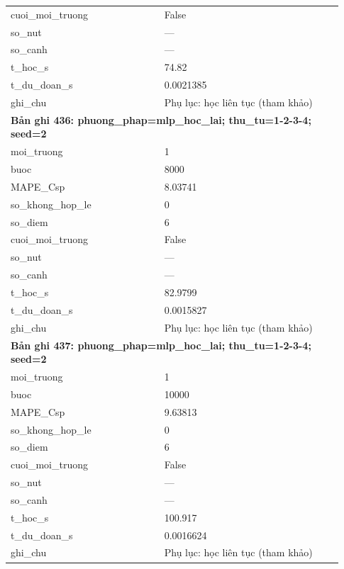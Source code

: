 \begin{longtable}{p{0.43\linewidth}p{0.50\linewidth}}
cuoi\_\allowbreak moi\_\allowbreak truong & False \\
so\_\allowbreak nut & — \\
so\_\allowbreak canh & — \\
t\_\allowbreak hoc\_\allowbreak s & 74.82 \\
t\_\allowbreak du\_\allowbreak doan\_\allowbreak s & 0.0021385 \\
ghi\_\allowbreak chu & Phụ lục: học liên tục (tham khảo) \\
\midrule
\multicolumn{2}{p{0.95\linewidth}}{\textbf{Bản ghi 436: phuong\_phap=mlp\_hoc\_lai; thu\_tu=1-2-3-4; seed=2}} \\
moi\_\allowbreak truong & 1 \\
buoc & 8000 \\
MAPE\_\allowbreak Csp & 8.03741 \\
so\_\allowbreak khong\_\allowbreak hop\_\allowbreak le & 0 \\
so\_\allowbreak diem & 6 \\
cuoi\_\allowbreak moi\_\allowbreak truong & False \\
so\_\allowbreak nut & — \\
so\_\allowbreak canh & — \\
t\_\allowbreak hoc\_\allowbreak s & 82.9799 \\
t\_\allowbreak du\_\allowbreak doan\_\allowbreak s & 0.0015827 \\
ghi\_\allowbreak chu & Phụ lục: học liên tục (tham khảo) \\
\midrule
\multicolumn{2}{p{0.95\linewidth}}{\textbf{Bản ghi 437: phuong\_phap=mlp\_hoc\_lai; thu\_tu=1-2-3-4; seed=2}} \\
moi\_\allowbreak truong & 1 \\
buoc & 10000 \\
MAPE\_\allowbreak Csp & 9.63813 \\
so\_\allowbreak khong\_\allowbreak hop\_\allowbreak le & 0 \\
so\_\allowbreak diem & 6 \\
cuoi\_\allowbreak moi\_\allowbreak truong & False \\
so\_\allowbreak nut & — \\
so\_\allowbreak canh & — \\
t\_\allowbreak hoc\_\allowbreak s & 100.917 \\
t\_\allowbreak du\_\allowbreak doan\_\allowbreak s & 0.0016624 \\
ghi\_\allowbreak chu & Phụ lục: học liên tục (tham khảo) \\

\end{longtable}
